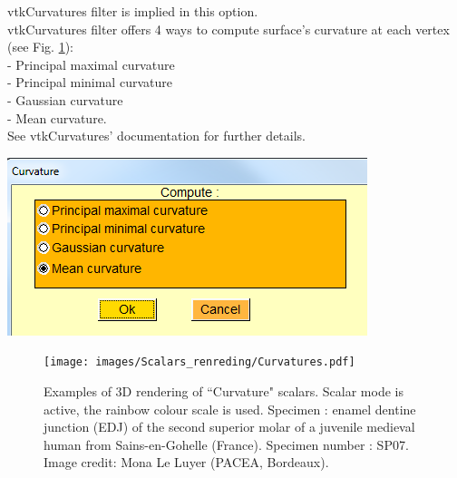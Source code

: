 \noindent
\begin{minipage}{0.5\textwidth}
vtkCurvatures filter is implied in this option.\\
vtkCurvatures filter offers 4 ways to compute surface's
curvature at each vertex (see Fig. \ref{curvatures}):\\
- Principal maximal curvature\\
- Principal minimal curvature\\
- Gaussian curvature\\
- Mean curvature.\\
See vtkCurvatures' documentation for further details.

\end{minipage}    
\begin{minipage}{0.5\textwidth}\centering
  \includegraphics[scale=0.5]{images/Scalars_renreding/Curvature_window.png}
\label{curvature_window}
 \end{minipage} 
\noindent

\begin{figure}
  \centering
  \texttt{[image: images/Scalars\_renreding/Curvatures.pdf]} 
	\caption{
Examples of 3D rendering of ``Curvature" scalars. Scalar mode is active, the rainbow colour scale is used. Specimen : enamel dentine junction (EDJ) of the second superior molar of a juvenile medieval human from Sains-en-Gohelle (France). Specimen number : SP07. Image credit: Mona Le Luyer (PACEA, Bordeaux).}
\label{curvatures}
 
\end{figure}

